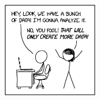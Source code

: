 \documentclass[11pt, letterpaper]{article}
\begin{document}
\begin{figure}[h]
	\centering
	\href{https://xkcd.com/2582/}{\includegraphics[width=0.35\textwidth]{img/data_trap.png}}
\end{figure}



\end{document}
